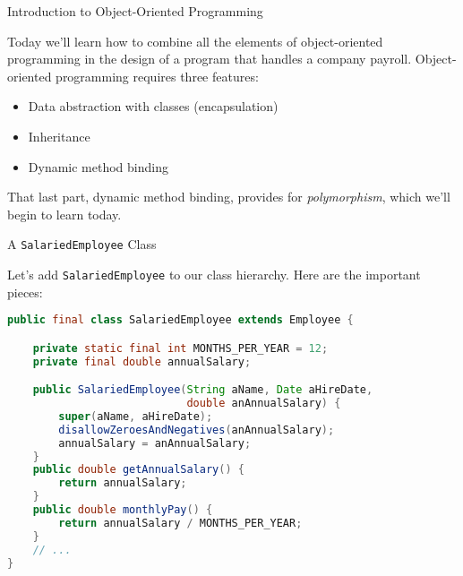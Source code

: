 \documentclass{beamer}
\author[Chris Simpkins] 
{Christopher Simpkins \\\texttt{chris.simpkins@gatech.edu}}
\institute[Georgia Tech] %
\date[CS 1331]{}
\title[\course] %
{\lesson}
\subtitle{}
\begin{document}
\begin{frame}
  \titlepage
\end{frame}

\begin{frame}[fragile]{Introduction to Object-Oriented Programming}


Today we'll learn how to combine all the elements of object-oriented programming in the design of a program that handles a company payroll.  Object-oriented programming requires three features:
\begin{itemize}
\item Data abstraction with classes (encapsulation)
\item Inheritance
\item Dynamic method binding
\end{itemize}

That last part, dynamic method binding, provides for {\it polymorphism}, which we'll begin to learn today.

\end{frame}
\begin{frame}[fragile]{A {\tt SalariedEmployee} Class}


Let's add {\tt SalariedEmployee} to our class hierarchy.  Here are the important pieces:
\begin{lstlisting}[language=Java]
public final class SalariedEmployee extends Employee {

    private static final int MONTHS_PER_YEAR = 12;
    private final double annualSalary;

    public SalariedEmployee(String aName, Date aHireDate,
                            double anAnnualSalary) {
        super(aName, aHireDate);
        disallowZeroesAndNegatives(anAnnualSalary);
        annualSalary = anAnnualSalary;
    }
    public double getAnnualSalary() {
        return annualSalary;
    }
    public double monthlyPay() {
        return annualSalary / MONTHS_PER_YEAR;
    }
    // ...
}
\end{lstlisting}

\end{frame}
\end{document}
